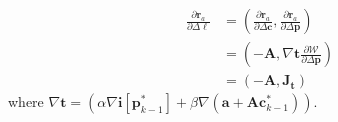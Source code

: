 \begin{equation}
    \begin{aligned}
		\frac{\partial \mathbf{r}_a}{\partial \Delta \boldsymbol{\ell}}& = \left( \frac{\partial \mathbf{r}_a}{\partial \Delta \mathbf{c}}, \frac{\partial \mathbf{r}_a}{\partial \Delta \mathbf{p}} \right)
		\\
		& = \left( -\mathbf{A}, \nabla \mathbf{t} \frac{\partial \mathcal{W}}{\partial \Delta \mathbf{p}} \right)
		\\
		& = \left( -\mathbf{A}, \mathbf{J}_\mathbf{t} \right)
    \label{eq:asymmetric_jacobian}
    \end{aligned}
\end{equation}
where $\nabla\mathbf{t} = \left( \alpha \nabla \mathbf{i}[\mathbf{p}_{k-1}^*]  + \beta \nabla (\mathbf{a} + \mathbf{A}\mathbf{c}_{k-1}^*) \right)$.

